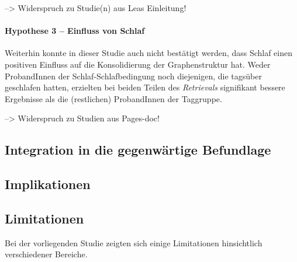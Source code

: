 --> Widerspruch zu Studie(n) aus Leas Einleitung!

\paragraph{Hypothese 3 – Einfluss von Schlaf}
Weiterhin konnte in dieser Studie auch nicht bestätigt werden, dass Schlaf einen positiven Einfluss auf die Konsolidierung der Graphenstruktur hat. Weder ProbandInnen der Schlaf-Schlafbedingung noch diejenigen, die tagsüber geschlafen hatten, erzielten bei beiden Teilen des \textit{Retrievals} signifikant bessere Ergebnisse als die (restlichen) ProbandInnen der Taggruppe.

--> Widerspruch zu Studien aus Pages-doc!

\subsection{Integration in die gegenwärtige Befundlage}

\subsection{Implikationen}




\subsection{Limitationen}
Bei der vorliegenden Studie zeigten sich einige Limitationen hinsichtlich verschiedener Bereiche.
